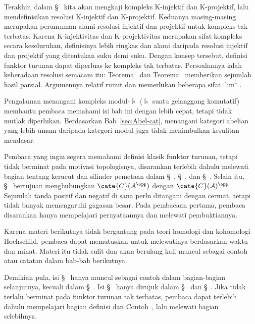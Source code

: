 Terakhir, dalam \S~ kita akan mengkaji
kompleks K-injektif dan K-projektif, lalu mendefinisikan resolusi K-injektif
dan K-projektif. Keduanya masing-masing merupakan perumuman alami resolusi
injektif dan projektif untuk kompleks tak terbatas. Karena K-injektivitas dan
K-projektivitas merupakan sifat kompleks secara keseluruhan, definisinya lebih
ringkas dan alami daripada resolusi injektif dan projektif yang ditentukan
suku demi suku. Dengan konsep tersebut, definisi funktor turunan dapat
diperluas ke kompleks tak terbatas. Persoalannya ialah keberadaan resolusi
semacam itu: Teorema~ dan Teorema~ memberikan sejumlah hasil parsial. Argumennya relatif rumit dan
memerlukan beberapa sifat $\lim^1$.

\begin{petunjukbacaan}
	Pengalaman menangani kompleks modul-$\Bbbk$ ($\Bbbk$ suatu gelanggang
	komutatif) membantu pembaca memahami isi bab ini dengan lebih cepat, tetapi
	tidak mutlak diperlukan. Berdasarkan Bab~\ref{sec:Abel-cat}, menangani
	kategori abelian yang lebih umum daripada kategori modul juga tidak
	menimbulkan kesulitan mendasar.

	Pembaca yang ingin segera memahami definisi klasik funktor turunan, tetapi
	tidak berminat pada motivasi topologisnya, disarankan terlebih dahulu melewati
	bagian tentang kerucut dan silinder pemetaan dalam
	\S~,
	\S~, dan
	\S~. Selain itu,
	\S~ bertujuan menghubungkan
	$\cate{C}(\mathcal{A}^{\opp})$ dengan
	$\cate{C}(\mathcal{A})^{\opp}$. Sejumlah tanda positif dan negatif di sana
	perlu ditangani dengan cermat, tetapi tidak banyak memengaruhi gagasan
	besar. Pada pembacaan pertama, pembaca disarankan hanya mempelajari
	pernyataannya dan melewati pembuktiannya.

	Karena materi berikutnya tidak bergantung pada teori homologi dan
	kohomologi Hochschild, pembaca dapat memutuskan untuk melewatinya berdasarkan
	waktu dan minat. Materi itu tidak sulit dan akan berulang kali muncul sebagai
	contoh atau catatan dalam bab-bab berikutnya.

	Demikian pula, isi \S~ hanya muncul sebagai
	contoh dalam bagian-bagian selanjutnya, kecuali dalam
	\S~. Isi
	\S~ hanya dirujuk dalam
	\S~ dan
	\S~. Jika tidak terlalu berminat pada
	funktor turunan tak terbatas, pembaca dapat terlebih dahulu mempelajari
	bagian definisi dan Contoh~, lalu melewati bagian selebihnya.
\end{petunjukbacaan}
